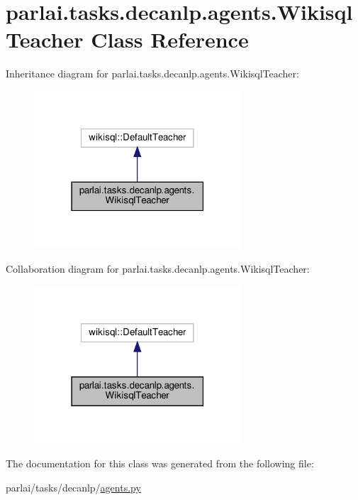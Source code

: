\hypertarget{classparlai_1_1tasks_1_1decanlp_1_1agents_1_1WikisqlTeacher}{}\section{parlai.\+tasks.\+decanlp.\+agents.\+Wikisql\+Teacher Class Reference}
\label{classparlai_1_1tasks_1_1decanlp_1_1agents_1_1WikisqlTeacher}


Inheritance diagram for parlai.\+tasks.\+decanlp.\+agents.\+Wikisql\+Teacher\+:
\nopagebreak
\begin{figure}[H]
\begin{center}
\leavevmode
\includegraphics[width=219pt]{classparlai_1_1tasks_1_1decanlp_1_1agents_1_1WikisqlTeacher__inherit__graph}
\end{center}
\end{figure}


Collaboration diagram for parlai.\+tasks.\+decanlp.\+agents.\+Wikisql\+Teacher\+:
\nopagebreak
\begin{figure}[H]
\begin{center}
\leavevmode
\includegraphics[width=219pt]{classparlai_1_1tasks_1_1decanlp_1_1agents_1_1WikisqlTeacher__coll__graph}
\end{center}
\end{figure}


The documentation for this class was generated from the following file\+:\begin{DoxyCompactItemize}
\item 
parlai/tasks/decanlp/\hyperlink{parlai_2tasks_2decanlp_2agents_8py}{agents.\+py}\end{DoxyCompactItemize}

